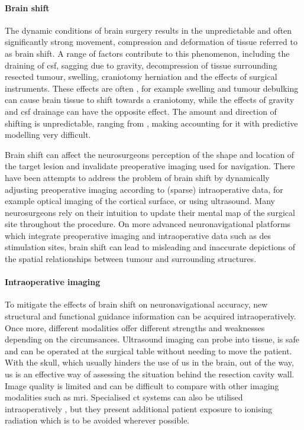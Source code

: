 \paragraph*{Brain shift}

The dynamic conditions of brain surgery results in the unpredictable and often significantly strong movement, compression and deformation of tissue referred to as brain shift.
A range of factors contribute to this phenomenon, including the draining of \gls{csf}, sagging due to gravity, decompression of tissue surrounding resected tumour, swelling, craniotomy herniation  and the effects of surgical instruments.
These effects are often , for example swelling and tumour debulking can cause brain tissue to shift towards a craniotomy, while the effects of gravity and \gls{csf} drainage can have the opposite effect.
The amount and direction of shifting is unpredictable, ranging from , making accounting for it with predictive modelling very difficult.

Brain shift can affect the neurosurgeons perception of the shape and location of the target lesion  and invalidate preoperative imaging used for navigation.
There have been attempts to address the problem of brain shift by dynamically adjusting preoperative imaging according to (sparse) intraoperative data, for example optical imaging of the cortical surface, or using ultrasound. 
Many neurosurgeons rely on their intuition to update their mental map of the surgical site throughout the procedure.
On more advanced neuronavigational platforms which integrate preoperative imaging and intraoperative data such as \gls{des} stimulation sites, brain shift can lead to misleading and inaccurate depictions of the spatial relationships between tumour and surrounding structures.

\paragraph*{Intraoperative imaging}

To mitigate the effects of brain shift on neuronavigational accuracy, new structural and functional guidance information can be acquired intraoperatively.
Once more, different modalities offer different strengths and weaknesses depending on the circumsances.
Ultrasound imaging can probe into tissue, is safe  and can be operated at the surgical table without needing to move the patient.
With the skull, which usually hinders the use of \gls{us} in the brain, out of the way, \gls{us} is an effective way of assessing the situation behind the resection cavity wall.
Image quality is limited and can be difficult to compare with other imaging modalities such as \gls{mri}.
Specialised \gls{ct} systems can also be utilised intraoperatively \note{[examples]}, but they present additional patient exposure to ionising radiation which is to be avoided wherever possible.

